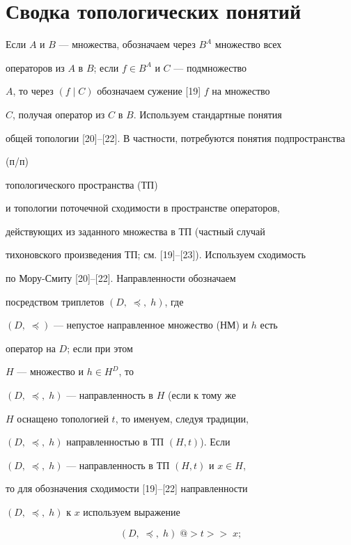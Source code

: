 \section{Сводка топологических понятий}





Если $A$ и $B$ --- множества, обозначаем через $B^A$ множество всех


операторов из $A$ в $B$; если $f \in {B^A}$ и $C$ --- подмножество


$A$, то через $(f \mid C)$ обозначаем сужение [19] $f$ на множество


$C$, получая оператор из $C$ в $B$. Используем стандартные понятия


общей топологии [20]--[22]. В частности, потребуются понятия подпространства


(п/п)


топологического пространства (ТП)


и топологии поточечной сходимости в пространстве операторов,


действующих из заданного множества в ТП (частный случай


тихоновского произведения ТП; см. [19]--[23]). Используем сходимость


по Мору-Смиту [20]--[22]. Направленности обозначаем


посредством триплетов $(D,\;\preceq,\;h)$, где


$(D,\;\preceq)$ --- непустое направленное множество (НМ) и $h$ есть


оператор на $D$; если при этом


$H$ --- множество и $h \in {H^D}$, то


$(D,\;\preceq,\;h)$ --- направленность в $H$ (если к тому же


$H$ оснащено топологией $t$, то именуем, следуя традиции,


$(D,\;\preceq,\;h)$ направленностью в ТП $(H,t)$). Если


$(D,\;\preceq,\;h)$ --- направленность в ТП $(H,t)$ и $x \in H$,


то для обозначения сходимости [19]--[22] направленности


$(D,\;\preceq,\;h)$ к $x$ используем выражение


\begin{equation}


(D,\;\preceq,\;h)\;@>t>>\;x;


\end{equation}


